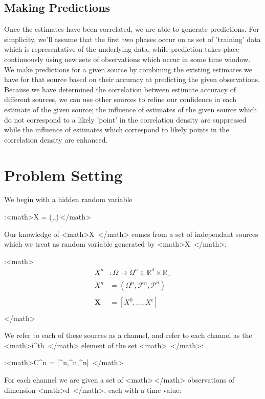 \documentclass[11pt,twocolumn,titlepage]{article}
\begin{document}
\subsection{Making Predictions}
Once the estimates have been correlated, we are able to generate predictions.  For simplicity, we'll assume that the first two phases occur on as set of 'training' data which is representative of the underlying data, while prediction takes place continuously using new sets of observations which occur in some time window.  We make predictions for a given source by combining the existing estimates we have for that source based on their accuracy at predicting the given observations.  Because we have determined the correlation between estimate accuracy of different sources, we can use other sources to refine our confidence in each estimate of the given source; the influence of estimates of the given source which do not correspond to a likely 'point' in the correlation density are suppressed while the influence of estimates which correspond to likely points in the correlation density are enhanced.

\section{Problem Setting}
We begin with a hidden random variable 

:<math>X = (\Omega,,)\,\!</math> 


Our knowledge of <math>X \,\!</math> comes from a set of independant sources which we treat as random variable generated by <math>X \,\!</math>:

:<math>
\begin{align}
X^n &: \Omega \mapsto \Omega^n \in \mathbb{R}^d \times \mathbb{R}_+ \\
X^n &= (\Omega^n,\mathcal{F}^n,\mathcal{P}^n) \\
\\
\mathbf{X} &= [X^0,...,X^c]   \\
\end{align}
</math> 


We refer to each of these sources as a channel, and refer to each channel as the <math>i^{th} \,\!</math> element of the set <math> \,\!</math>:

:<math>C^n = [\Omega^n,^n,^n] \,\!</math>


For each channel we are given a set of <math>\ell \,\!</math> observations of dimension <math>d \,\!</math>, each with a time value:
\end{document}
